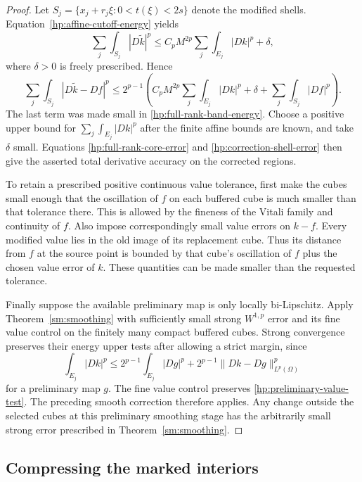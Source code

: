 \documentclass[11pt]{article}
\numberwithin{equation}{section}
\theoremstyle{definition}
\theoremstyle{remark}
\begin{document}
\begin{proof}
Let $S_j=\{x_j+r_j\xi:0<t(\xi)<2s\}$ denote the modified shells.
Equation~\eqref{hp:affine-cutoff-energy} yields
\[
 \sum_j\int_{S_j}|D\widetilde k|^p
 \leq C_pM^{2p}\sum_j\int_{E_j}|Dk|^p+\delta,
\]
where $\delta>0$ is freely prescribed.  Hence
\begin{equation}\label{hp:correction-shell-error}
 \sum_j\int_{S_j}|D\widetilde k-Df|^p
 \leq2^{p-1}\left(
 C_pM^{2p}\sum_j\int_{E_j}|Dk|^p+\delta
 +\sum_j\int_{S_j}|Df|^p\right).
\end{equation}
The last term was made small in
\eqref{hp:full-rank-band-energy}.  Choose a positive upper bound
for $\sum_j\int_{E_j}|Dk|^p$ after the finite affine bounds are
known, and take $\delta$ small.  Equations
\eqref{hp:full-rank-core-error} and
\eqref{hp:correction-shell-error} then give the asserted total
derivative accuracy on the corrected regions.

To retain a prescribed positive continuous value tolerance, first
make the cubes small enough that the oscillation of $f$ on each
buffered cube is much smaller than that tolerance there.  This is
allowed by the fineness of the Vitali family and continuity of $f$.
Also impose correspondingly small value errors on $k-f$.
Every modified value lies in the old image of its replacement cube.
Thus its distance from $f$ at the source point is bounded by that
cube's oscillation of $f$ plus the chosen value error of $k$.
These quantities can be made smaller than the requested tolerance.

Finally suppose the available preliminary map is only locally
bi-Lipschitz.  Apply Theorem~\ref{sm:smoothing} with sufficiently
small strong $W^{1,p}$ error and its fine value control on the
finitely many compact buffered cubes.  Strong convergence preserves
their energy upper tests after allowing a strict margin, since
\[
 \int_{E_j}|Dk|^p
 \leq2^{p-1}\int_{E_j}|Dg|^p
      +2^{p-1}\|Dk-Dg\|_{L^p(\Omega)}^p
\]
for a preliminary map $g$.  The fine value control preserves
\eqref{hp:preliminary-value-test}.  The preceding smooth correction
therefore applies.  Any change outside the selected cubes at this
preliminary smoothing stage has the arbitrarily small strong error
prescribed in Theorem~\ref{sm:smoothing}.
\end{proof}

\subsection{Compressing the marked interiors}
\end{document}
